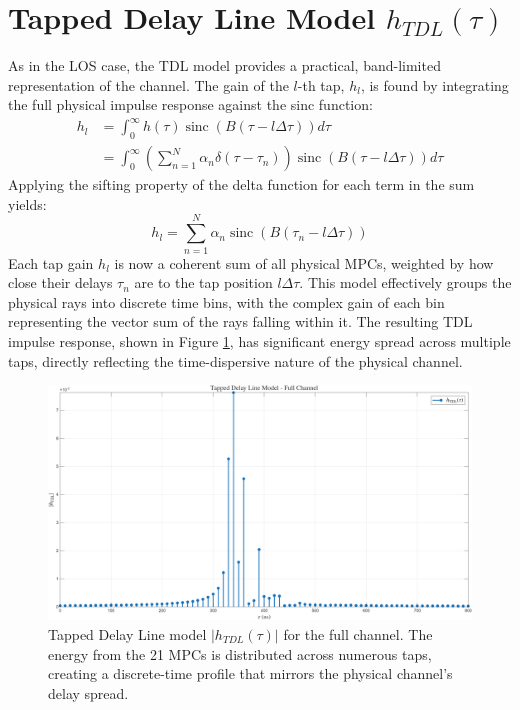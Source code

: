 \section{Tapped Delay Line Model $h_{TDL}(\tau)$}
As in the LOS case, the TDL model provides a practical, band-limited representation of the channel. The gain of the $l$-th tap, $h_l$, is found by integrating the full physical impulse response against the sinc function:
\begin{align}
	h_l &= \int_0^{\infty} h(\tau) \operatorname{sinc}(B(\tau-l \Delta \tau)) d \tau \\
	&= \int_0^{\infty} \left( \sum_{n=1}^{N} \alpha_n \delta(\tau - \tau_n) \right) \operatorname{sinc}(B(\tau-l \Delta \tau)) d \tau
\end{align}
Applying the sifting property of the delta function for each term in the sum yields:
\begin{equation}
	\boxed{h_l = \sum_{n=1}^{N} \alpha_n \operatorname{sinc}(B(\tau_n - l \Delta \tau))}
\end{equation}
Each tap gain $h_l$ is now a coherent sum of all physical MPCs, weighted by how close their delays $\tau_n$ are to the tap position $l\Delta\tau$. This model effectively groups the physical rays into discrete time bins, with the complex gain of each bin representing the vector sum of the rays falling within it. The resulting TDL impulse response, shown in Figure \ref{fig:h_tdl_full}, has significant energy spread across multiple taps, directly reflecting the time-dispersive nature of the physical channel.

\begin{figure}[h!]
	\centering
	\includegraphics[width=\linewidth]{"content/4-images/Tapped Delay Line Model - Full Channel.png"}
	\caption{Tapped Delay Line model $|h_{TDL}(\tau)|$ for the full channel. The energy from the 21 MPCs is distributed across numerous taps, creating a discrete-time profile that mirrors the physical channel's delay spread.}
	\label{fig:h_tdl_full}
\end{figure}

